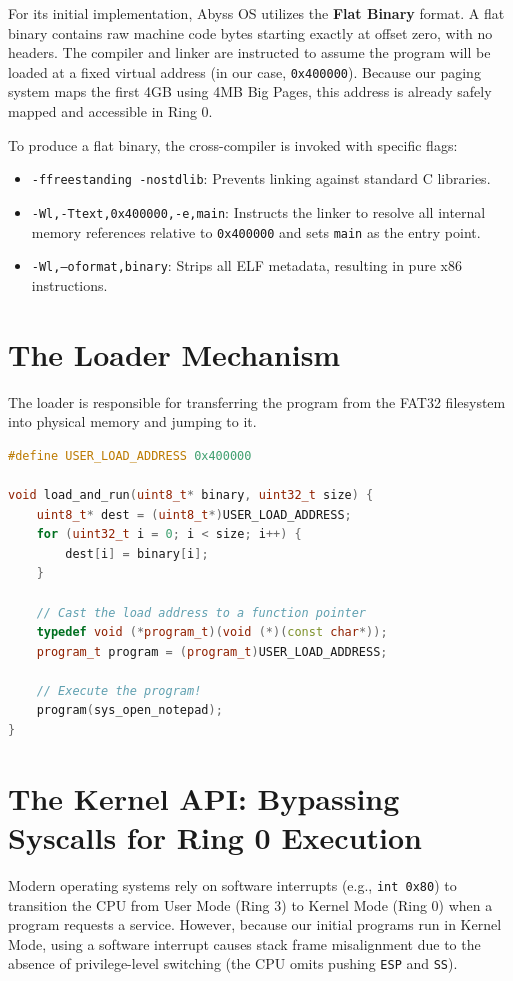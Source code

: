 \documentclass[12pt,a4paper]{report}
\begin{document}
For its initial implementation, Abyss OS utilizes the \textbf{Flat Binary} format. A flat binary contains raw machine code bytes starting exactly at offset zero, with no headers. The compiler and linker are instructed to assume the program will be loaded at a fixed virtual address (in our case, \texttt{0x400000}). Because our paging system maps the first 4GB using 4MB Big Pages, this address is already safely mapped and accessible in Ring 0.

To produce a flat binary, the cross-compiler is invoked with specific flags:
\begin{itemize}
    \item \texttt{-ffreestanding -nostdlib}: Prevents linking against standard C libraries.
    \item \texttt{-Wl,-Ttext,0x400000,-e,main}: Instructs the linker to resolve all internal memory references relative to \texttt{0x400000} and sets \texttt{main} as the entry point.
    \item \texttt{-Wl,--oformat,binary}: Strips all ELF metadata, resulting in pure x86 instructions.
\end{itemize}

\section{The Loader Mechanism}
The loader is responsible for transferring the program from the FAT32 filesystem into physical memory and jumping to it.

\begin{lstlisting}[language=C++, title=kernel/loader.cpp -- The Loader]
#define USER_LOAD_ADDRESS 0x400000

void load_and_run(uint8_t* binary, uint32_t size) {
    uint8_t* dest = (uint8_t*)USER_LOAD_ADDRESS;
    for (uint32_t i = 0; i < size; i++) {
        dest[i] = binary[i];
    }

    // Cast the load address to a function pointer
    typedef void (*program_t)(void (*)(const char*));
    program_t program = (program_t)USER_LOAD_ADDRESS;
    
    // Execute the program!
    program(sys_open_notepad);
}
\end{lstlisting}

\section{The Kernel API: Bypassing Syscalls for Ring 0 Execution}
Modern operating systems rely on software interrupts (e.g., \texttt{int 0x80}) to transition the CPU from User Mode (Ring 3) to Kernel Mode (Ring 0) when a program requests a service. However, because our initial programs run in Kernel Mode, using a software interrupt causes stack frame misalignment due to the absence of privilege-level switching (the CPU omits pushing \texttt{ESP} and \texttt{SS}).
\end{document}
